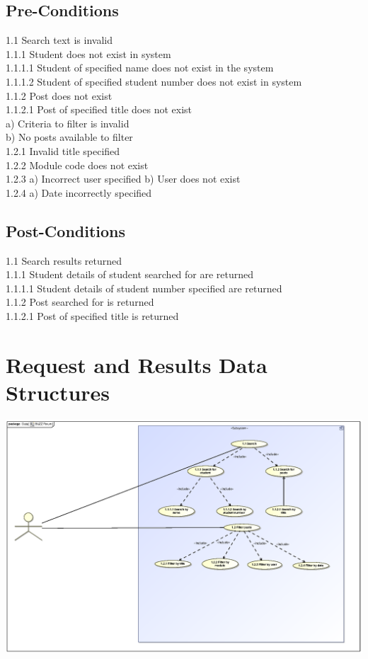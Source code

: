 \documentclass{scrreprt}
\begin{document}
\subsection{Pre-Conditions}								%
1.1	Search text is invalid\\
1.1.1	Student does not exist in system\\
1.1.1.1	Student of specified name does not exist in the system\\
1.1.1.2	Student of specified student number does not exist in system\\
1.1.2	Post does not exist\\
1.1.2.1	Post of specified title does not exist\\
	a) Criteria to filter is invalid\\
b) No posts available to filter\\
1.2.1	Invalid title specified\\
1.2.2	Module code does not exist\\
1.2.3	a) Incorrect user specified
b) User does not exist\\
1.2.4	a) Date incorrectly specified\\
\subsection{Post-Conditions}%
1.1	Search results returned\\
1.1.1	Student details of student searched for are returned\\
1.1.1.1	Student details of student number specified are returned\\
1.1.2	Post searched for is returned\\
1.1.2.1	Post of specified title is returned\\

\section{Request and Results Data Structures} 
\includegraphics[scale=.9]{graphics/searchAndFilterUseCase.eps}\\
\end{document}

